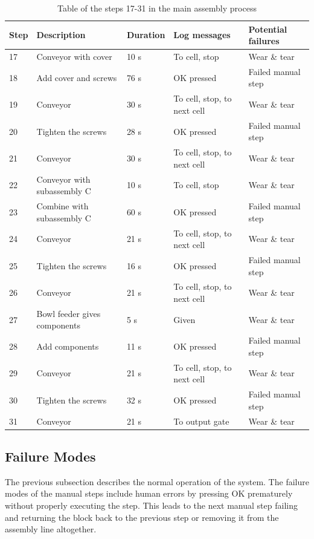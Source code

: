 \documentclass[journal]{IEEEtran}
\begin{document}
\begin{table}[!t]
\renewcommand{\arraystretch}{1.3}
\caption{Table of the steps 17-31 in the main assembly process}
\label{mainsteps2}
\centering
\begin{tabular}{|p{5mm}|p{20mm}|p{10mm}|p{15mm}|p{15mm}|}
\hline
Step & Description & Duration & Log messages & Potential failures \\
\hline
\hline
17 & Conveyor with cover & 10 s & To cell, stop & Wear \& tear \\
\hline
18 & Add cover and screws & 76 s & OK pressed & Failed manual step \\
\hline
19 & Conveyor & 30 s & To cell, stop, to next cell & Wear \& tear \\
\hline
20 & Tighten the screws & 28 s & OK pressed & Failed manual step \\
\hline
21 & Conveyor & 30 s & To cell, stop, to next cell & Wear \& tear \\
\hline
22 & Conveyor with subassembly C & 10 s & To cell, stop & Wear \& tear \\
\hline
23 & Combine with subassembly C & 60 s & OK pressed & Failed manual step \\
\hline
24 & Conveyor & 21 s & To cell, stop, to next cell & Wear \& tear \\
\hline
25 & Tighten the screws & 16 s & OK pressed & Failed manual step \\
\hline
26 & Conveyor & 21 s & To cell, stop, to next cell & Wear \& tear \\
\hline
27 & Bowl feeder gives components & 5 s & Given & Wear \& tear \\
\hline
28 & Add components & 11 s & OK pressed & Failed manual step \\
\hline
29 & Conveyor & 21 s & To cell, stop, to next cell & Wear \& tear \\
\hline
30 & Tighten the screws & 32 s & OK pressed & Failed manual step \\
\hline
31 & Conveyor & 21 s & To output gate & Wear \& tear \\
\hline
\end{tabular}
\end{table}

\subsection{Failure Modes}
The previous subsection describes the normal operation of the system. The failure modes of the manual steps include human errors by pressing OK
prematurely without properly executing the step. This leads to the next manual step failing and returning the block back to the previous step or
removing it from the assembly line altogether.
\end{document}
